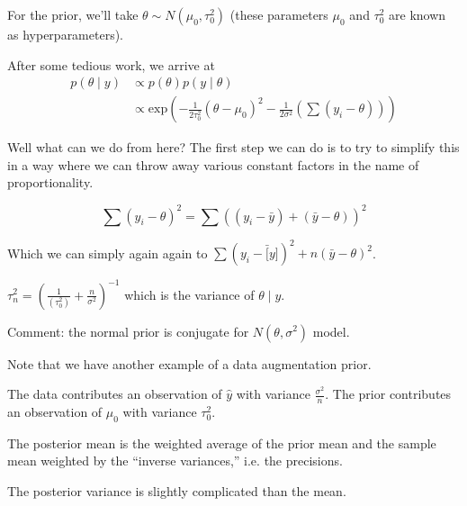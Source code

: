 \documentclass[a4paper]{article}
\begin{document}
For the prior, we'll take $\theta \sim N\left( \mu _0, \tau _0 ^2 \right)$ (these parameters $\mu _0$ and $\tau _0 ^2$ are known as hyperparameters).

After some tedious work, we arrive at 
\begin{align}
p\left( \theta \mid y \right) &\propto p\left( \theta \right) p\left( y \mid \theta \right)\\
&\propto \text{exp}\left( - \frac{1}{2 \tau _0 ^2}\left( \theta - \mu_0 \right)^2 - \frac{1}{2 \sigma ^2}\left( \sum \left( y _i - \theta \right) \right) \right)
\end{align}

Well what can we do from here? The first step we can do is to try to simplify
this in a way where we can throw away various constant factors in the name of
proportionality.

\begin{equation}
	\sum \left( y _i - \theta \right)^2 = \sum \left( \left( y _i - \bar{y} \right) + \left( \bar{y} - \theta \right) \right)^2
\end{equation}

Which we can simply again again to $\sum \left( y _i - \bar[y]  \right)^2 + n \left( \bar{y} - \theta \right) ^2$.



$\tau _n ^2 = \left( \frac{1}{\left(\tau _0 ^2 \right)} + \frac{n}{\sigma ^2} \right) ^{-1}$ which is the variance of $\theta \mid y$.

Comment: the normal prior is conjugate for $N\left( \theta, \sigma ^2 \right)$ model.

Note that we have another example of a data augmentation prior.

The data contributes an observation of $\hat{y}$ with variance
$\frac{\sigma^2}{n}$. The prior contributes an observation of $\mu_0$ with
variance $\tau _0 ^2$.

The posterior mean is the weighted average of the prior mean and the sample
mean weighted by the ``inverse variances,'' i.e. the precisions.

The posterior variance is slightly complicated than the mean.
\end{document}

